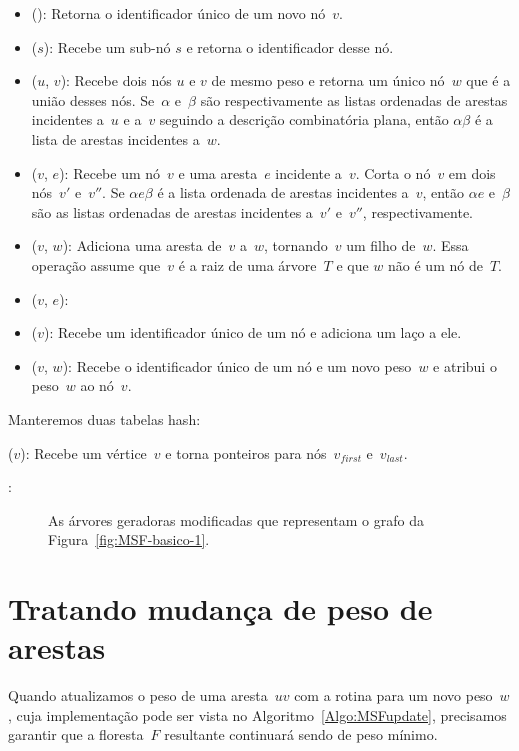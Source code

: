 \begin{itemize}
\item \LCOMakeNode(): Retorna o identificador único de um novo nó~$v$.
\item \LCOFindNode($s$): Recebe um sub-nó $s$ e retorna o identificador desse nó.
\item \LCOMerge($u$, $v$): Recebe dois nós $u$ e $v$ de mesmo peso e retorna um único nó~$w$ que é a união desses nós.
Se~$\alpha$ e~$\beta$ são respectivamente as listas ordenadas de arestas incidentes a~$u$ e a~$v$ seguindo a descrição combinatória plana, então $\alpha\beta$ é a lista de arestas incidentes a~$w$.
\item \LCOSplit($v$, $e$): Recebe um nó~$v$ e uma aresta~$e$ incidente a~$v$.
Corta o nó~$v$ em dois nós~$v'$ e~$v''$. Se $\alpha e\beta$ é a lista ordenada de arestas incidentes a~$v$, então $\alpha e$ e~$\beta$ são as listas ordenadas de arestas incidentes a~$v'$ e~$v''$, respectivamente.
\item \LCOLink($v$, $w$): Adiciona uma aresta de~$v$ a~$w$, tornando~$v$ um filho de~$w$. Essa operação assume que~$v$ é a raiz de uma árvore~$T$ e que $w$ não é um nó de~$T$.
\item \LCOCycle($v$, $e$):
\item \LCOLoop($v$): Recebe um identificador único de um nó e adiciona um laço a ele.
\item \LCOAddCost($v$, $w$): Recebe o identificador único de um nó e um novo peso~$w$ e atribui o peso~$w$ ao nó~$v$.
\end{itemize}

Manteremos duas tabelas hash:

\hashNP($v$): Recebe um vértice~$v$ e torna ponteiros para nós~$v_{first}$ e~$v_{last}$.

\hashEdges:

\begin{figure}[htb]
\scalebox{1.5}{
\centering

}
\caption{As árvores geradoras modificadas que representam o grafo da Figura~\ref{fig:MSF-basico-1}.}
\label{fig:MSF-figura-4}
\end{figure}


\section{Tratando mudança de peso de arestas}

Quando atualizamos o peso de uma aresta~$uv$ com a rotina \MSFupdate{} para um novo peso~$w$, cuja implementação pode ser vista no Algoritmo~\ref{Algo:MSFupdate}, precisamos garantir que a floresta~$F$ resultante continuará sendo  de peso mínimo.

